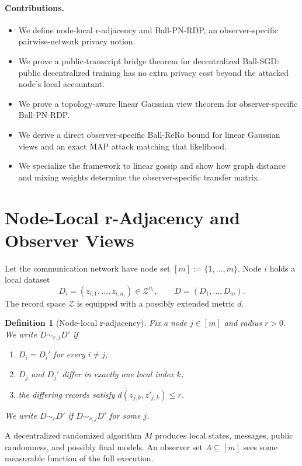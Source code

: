 \documentclass[conference,compsoc]{IEEEtran}
\newtheorem{definition}{Definition}
\newcommand{\cZ}{\mathcal{Z}}
\begin{document}
\paragraph{Contributions.}
\begin{itemize}[leftmargin=1.4em]
    \item We define node-local r-adjacency and Ball-PN-RDP, an observer-specific pairwise-network privacy notion.
    \item We prove a public-transcript bridge theorem for decentralized Ball-SGD: public decentralized training has no extra privacy cost beyond the attacked node's local accountant.
    \item We prove a topology-aware linear Gaussian view theorem for observer-specific Ball-PN-RDP.
    \item We derive a direct observer-specific Ball-ReRo bound for linear Gaussian views and an exact MAP attack matching that likelihood.
    \item We specialize the framework to linear gossip and show how graph distance and mixing weights determine the observer-specific transfer matrix.
\end{itemize}

\section{Node-Local r-Adjacency and Observer Views}
\label{sec:setup}

Let the communication network have node set $[m]:=\{1,\ldots,m\}$. Node $i$ holds a local dataset
\[
D_i=(z_{i,1},\ldots,z_{i,n_i})\in\cZ^{n_i},
\qquad
D=(D_1,\ldots,D_m).
\]
The record space $\cZ$ is equipped with a possibly extended metric $d$.

\begin{definition}[Node-local r-adjacency]
Fix a node $j\in[m]$ and radius $r>0$. We write $D\sim_{r,j}D'$ if
\begin{enumerate}[leftmargin=1.4em]
    \item $D_i=D_i'$ for every $i\ne j$;
    \item $D_j$ and $D_j'$ differ in exactly one local index $k$;
    \item the differing records satisfy $d(z_{j,k},z'_{j,k})\le r$.
\end{enumerate}
We write $D\sim_rD'$ if $D\sim_{r,j}D'$ for some $j$.
\end{definition}

A decentralized randomized algorithm $M$ produces local states, messages, public randomness, and possibly final models. An observer set $A\subseteq[m]$ sees some measurable function of the full execution.
\end{document}
